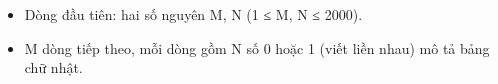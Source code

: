 \begin{itemize}
	\item Dòng đầu tiên: hai số nguyên M, N (1 ≤ M, N ≤ 2000).
	\item M dòng tiếp theo, mỗi dòng gồm N số 0 hoặc 1 (viết liền nhau) mô tả bảng chữ nhật.
\end{itemize}